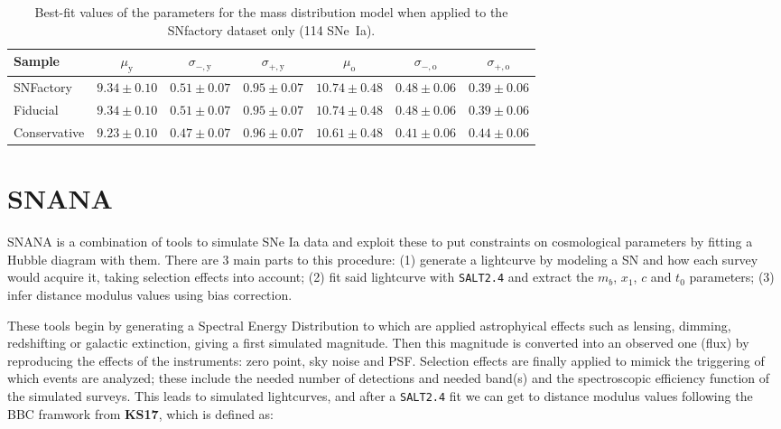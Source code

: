 \documentclass[]{aa}
\begin{document}
\begin{table}
    \centering
    \caption{Best-fit values of the parameters for the mass distribution
    model when applied to the SNfactory dataset only (114 SNe~Ia).}
    \label{tab:modelresults}
    \begin{tabular}{lcccccc}
        \toprule
        Sample  & $\mu_\mathrm{y} $ &
                $\sigma_{-,\mathrm{y}}$ & $\sigma_{+,\mathrm{y}}$
                & $\mu_\mathrm{o} $ &
                $\sigma_{-,\mathrm{o}}$ & $\sigma_{+,\mathrm{o}}$ \\[0.2em]
        \midrule
        SNFactory     & $ 9.34 \pm 0.10 $
                      & $0.51 \pm 0.07 $ & $0.95 \pm 0.07 $
                      & $10.74 \pm 0.48 $
                      & $ 0.48 \pm 0.06 $ & $0.39 \pm 0.06 $ \\
        Fiducial      & $ 9.34 \pm 0.10 $
                      & $0.51 \pm 0.07 $ & $0.95 \pm 0.07 $
                      & $10.74 \pm 0.48 $
                      & $ 0.48 \pm 0.06 $ & $0.39 \pm 0.06 $ \\
        Conservative  & $ 9.23 \pm 0.10 $
                      & $0.47 \pm 0.07 $ & $0.96 \pm 0.07 $
                      & $10.61 \pm 0.48 $
                      & $ 0.41 \pm 0.06 $ & $0.44 \pm 0.06 $ \\
        \bottomrule
    \end{tabular}
\end{table}

\section{SNANA}

SNANA is a combination of tools to simulate SNe Ia data and exploit these to put
constraints on cosmological parameters by fitting a Hubble diagram with them.
There are 3 main parts to this procedure: (1) generate a lightcurve by modeling
a SN and how each survey would acquire it, taking selection effects into
account; (2) fit said lightcurve with \texttt{SALT2.4} and extract the $m_b$,
$x_1$, $c$ and $t_0$ parameters; (3) infer distance modulus values using bias
correction.

These tools begin by generating a Spectral Energy Distribution to which are
applied astrophyical effects such as lensing, dimming, redshifting or galactic
extinction, giving a first simulated magnitude. Then this magnitude is converted
into an observed one (flux) by reproducing the effects of the instruments: zero
point, sky noise and PSF. Selection effects are finally applied to mimick the
triggering of which events are analyzed; these include the needed number of
detections and needed band(s) and the spectroscopic efficiency function of the
simulated surveys. This leads to simulated lightcurves, and after a
\texttt{SALT2.4} fit we can get to distance modulus values following the BBC
framwork from \textbf{KS17}, which is defined as:
\end{document}

